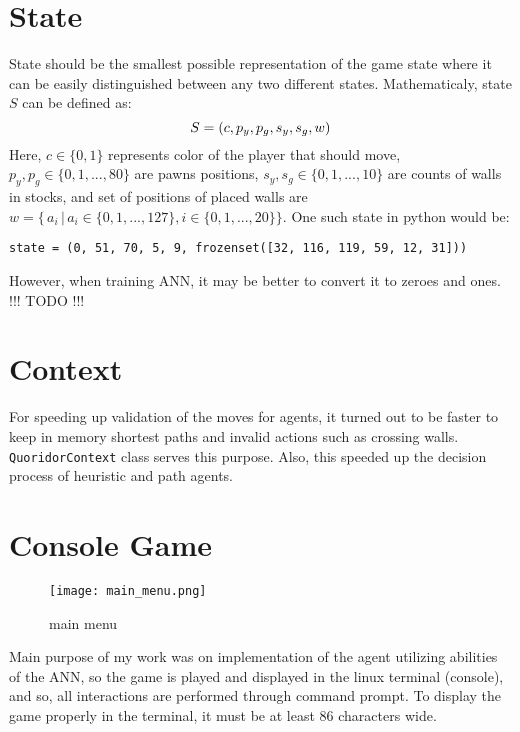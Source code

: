 \section{State}
State should be the smallest possible representation of the game state where
it can be easily distinguished between any two different states. Mathematicaly,
state $S$ can be defined as:
\begin{equation}
  \label{eqn:state_def}
  S = (c, p_y, p_g, s_y, s_g, w)
  \vspace*{-0.20cm}
\end{equation}
Here, $c\in\{0, 1\} $ represents color of the player that should move,
$p_y,p_g\in\{0,1,...,80\}$ are pawns positions,
${s_y},{s_g} \in \{0, 1, ..., 10\}$ are counts of walls in stocks,
and set of positions of placed walls are
${w = \{\,a_i\,|\,a_i \in \{0, 1, ..., 127\}, i \in \{0, 1, ..., 20\} \}}$.
One such state in python would be:
\begin{lstlisting}
state = (0, 51, 70, 5, 9, frozenset([32, 116, 119, 59, 12, 31]))
\end{lstlisting}

However, when training ANN, it may be better to convert it to zeroes and ones.
!!! TODO !!!


\section{Context}
For speeding up validation of the moves for agents, it turned out to be faster
to keep in memory shortest paths and invalid actions such as crossing walls.
{\lstinline{QuoridorContext}} class serves this purpose.
Also, this speeded up the decision process of heuristic and path agents.

\section{Console Game}
\begin{wrapfigure}{r}{0.5\textwidth}
  \vspace*{-2.05cm}
  \centering
  \texttt{[image: main\_menu.png]}
  \vspace*{-0.35cm}
  \caption{main menu}
  \label{fig:main_menu}
  \vspace*{-0.70cm}
\end{wrapfigure}

Main purpose of my work was on implementation of the agent utilizing abilities
of the ANN, so the game is played and displayed in the linux terminal
(console), and so, all interactions are performed through command prompt.
To display the game properly in the terminal, it must be at least 86 characters
wide.

